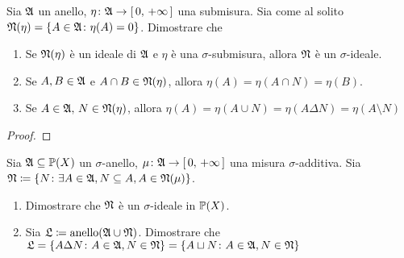 \documentclass[../EserciziIstituzioniAnalisi.tex]{subfiles}
\begin{document}
\begin{exercise}[2016-10-20-1]
  Sia $\mathfrak A$ un anello, $\eta\colon\mathfrak A\to\left[\,0,\,+\infty\,\right]$ una submisura. Sia come al solito $\mathfrak N(\eta)=\left\{A\in\mathfrak A\colon\eta(A)=0\right\}$. Dimostrare che
  \begin{enumerate}
    \item Se $\mathfrak N(\eta)$ è un ideale di $\mathfrak A$ e $\eta$ è una $\sigma$-submisura, allora $\mathfrak N$ è un $\sigma$-ideale.
    \item Se $A,B\in \mathfrak A$ e $A\cap B\in \mathfrak N(\eta)$, allora $\eta(A)=\eta(A\cap N)=\eta(B)$.
    \item Se $A\in \mathfrak A,\, N\in \mathfrak N(\eta)$, allora $\eta(A)=\eta(A\cup N)=\eta(A\Delta N)=\eta(A\setminus N)$
  \end{enumerate}
\end{exercise}
\begin{proof}
  
\end{proof}
\begin{exercise}[2016-10-20-2]
  Sia $\mathfrak A\subseteq\mathbb P(X)$ un $\sigma$-anello, $\mu\colon \mathfrak A\to\left[\,0,\,+\infty\,\right]$ una misura $\sigma$-additiva.
  Sia $\mathfrak N\coloneqq\left\{N\colon\exists A\in \mathfrak A, N\subseteq A, A\in \mathfrak N(\mu)\right\}$.

  \begin{enumerate}
    \item Dimostrare che $\mathfrak N$ è un $\sigma$-ideale in $\mathbb P(X)$.
    \item Sia $\mathfrak L\coloneqq\operatorname{anello}(\mathfrak A\cup\mathfrak N)$. Dimostrare che $\mathfrak L=\left\{A\Delta N\colon A\in\mathfrak A,N\in\mathfrak N\right\}=\left\{A\sqcup N\colon A\in\mathfrak A,N\in\mathfrak N\right\}$ 
  \end{enumerate}
\end{exercise}
\end{document}
